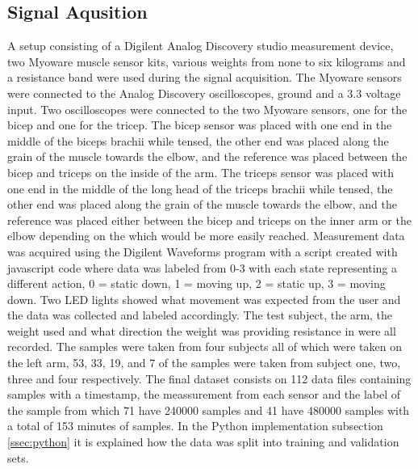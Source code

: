\subsection{Signal Aqusition}
A setup consisting of a Digilent Analog Discovery studio measurement device, two Myoware muscle sensor 
kits, various weights from none to six kilograms and a resistance 
band were used during the signal acquisition. The Myoware sensors were connected to the Analog Discovery 
oscilloscopes, ground and a 3.3 voltage input. Two oscilloscopes were connected to the two Myoware 
sensors, one for the bicep and one for the tricep. The bicep sensor was placed with one end in the 
middle of the biceps brachii while tensed, the other end was placed along the grain of the muscle 
towards the elbow, and the reference was placed between the bicep and triceps on the inside of the arm. 
The triceps sensor was placed with one end in the middle of the long head of the triceps brachii while 
tensed, the other end was placed along the grain of the muscle towards the elbow, and the reference was 
placed either between the bicep and triceps on the inner arm or the elbow depending on the which would 
be more easily reached. Measurement data was acquired using the Digilent Waveforms program with a 
script created with javascript code where data was labeled from 0-3 with each state representing a 
different action, 0 = static down, 1 = moving up, 2 = static up, 3 = moving down. Two LED lights showed what 
movement was expected from the user and the data was collected and labeled accordingly. The test subject, 
the arm, the weight used and what direction the weight was providing resistance in were all recorded. 
The samples were taken from four subjects all of which were taken on the left arm, 53, 33, 19, and 7 of the 
samples were taken from subject one, two, three and four respectively. The final dataset consists on 112 data files
containing samples with a timestamp, the meassurement from each sensor and the label of the sample
from which 71 have 240000 samples and 41 have 480000 samples with a total of 153 minutes of samples. In the Python implementation
subsection \ref{ssec:python} it is explained how the data was split into training and validation sets.

